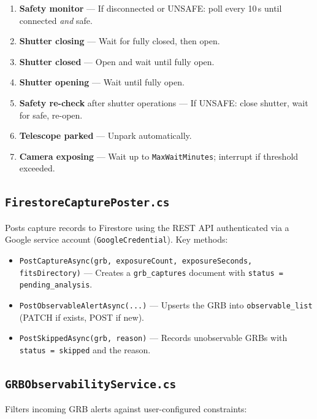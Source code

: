 \documentclass[12pt,a4paper]{article}
\begin{document}
\begin{enumerate}
    \item \textbf{Safety monitor} --- If disconnected or UNSAFE: poll every
          10\,s until connected \textit{and} safe.
    \item \textbf{Shutter closing} --- Wait for fully closed, then open.
    \item \textbf{Shutter closed} --- Open and wait until fully open.
    \item \textbf{Shutter opening} --- Wait until fully open.
    \item \textbf{Safety re-check} after shutter operations --- If UNSAFE:
          close shutter, wait for safe, re-open.
    \item \textbf{Telescope parked} --- Unpark automatically.
    \item \textbf{Camera exposing} --- Wait up to \texttt{MaxWaitMinutes};
          interrupt if threshold exceeded.
\end{enumerate}

\subsection{\texttt{FirestoreCapturePoster.cs}}

Posts capture records to Firestore using the REST API authenticated via a
Google service account (\texttt{GoogleCredential}). Key methods:

\begin{itemize}
    \item \texttt{PostCaptureAsync(grb, exposureCount, exposureSeconds,
          fitsDirectory)} --- Creates a \texttt{grb\_captures} document
          with \texttt{status = pending\_analysis}.
    \item \texttt{PostObservableAlertAsync(...)} --- Upserts the GRB into
          \texttt{observable\_list} (PATCH if exists, POST if new).
    \item \texttt{PostSkippedAsync(grb, reason)} --- Records unobservable
          GRBs with \texttt{status = skipped} and the reason.
\end{itemize}

\subsection{\texttt{GRBObservabilityService.cs}}

Filters incoming GRB alerts against user-configured constraints:
\end{document}
